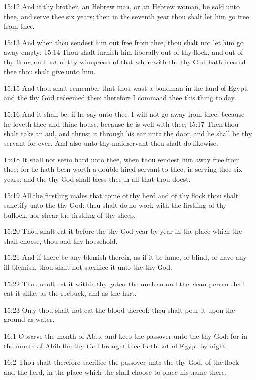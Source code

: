 15:12 And if thy brother, an Hebrew man, or an Hebrew woman, be sold
unto thee, and serve thee six years; then in the seventh year thou
shalt let him go free from thee.

15:13 And when thou sendest him out free from thee, thou shalt not let
him go away empty: 15:14 Thou shalt furnish him liberally out of thy
flock, and out of thy floor, and out of thy winepress: of that
wherewith the \LORD thy God hath blessed thee thou shalt give unto him.

15:15 And thou shalt remember that thou wast a bondman in the land of
Egypt, and the \LORD thy God redeemed thee: therefore I command thee
this thing to day.

15:16 And it shall be, if he say unto thee, I will not go away from
thee; because he loveth thee and thine house, because he is well with
thee; 15:17 Then thou shalt take an aul, and thrust it through his ear
unto the door, and he shall be thy servant for ever. And also unto thy
maidservant thou shalt do likewise.

15:18 It shall not seem hard unto thee, when thou sendest him away
free from thee; for he hath been worth a double hired servant to thee,
in serving thee six years: and the \LORD thy God shall bless thee in
all that thou doest.

15:19 All the firstling males that come of thy herd and of thy flock
thou shalt sanctify unto the \LORD thy God: thou shalt do no work with
the firstling of thy bullock, nor shear the firstling of thy sheep.

15:20 Thou shalt eat it before the \LORD thy God year by year in the
place which the \LORD shall choose, thou and thy household.

15:21 And if there be any blemish therein, as if it be lame, or blind,
or have any ill blemish, thou shalt not sacrifice it unto the \LORD thy
God.

15:22 Thou shalt eat it within thy gates: the unclean and the clean
person shall eat it alike, as the roebuck, and as the hart.

15:23 Only thou shalt not eat the blood thereof; thou shalt pour it
upon the ground as water.

16:1 Observe the month of Abib, and keep the passover unto the \LORD
thy God: for in the month of Abib the \LORD thy God brought thee forth
out of Egypt by night.

16:2 Thou shalt therefore sacrifice the passover unto the \LORD thy
God, of the flock and the herd, in the place which the \LORD shall
choose to place his name there.

